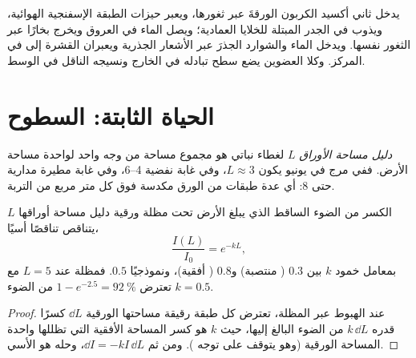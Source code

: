 \begin{example}\label{ex:b1:flowering-plant-organization:where}
يدخل ثاني أكسيد الكربون الورقةَ عبر ثغورها، ويعبر حيزات الطبقة
الإسفنجية الهوائية، ويذوب في الجدر المبتلة للخلايا العمادية؛ ويصل
الماء في  العروق ويخرج بخارًا عبر الثغور نفسها. ويدخل الماء
والشوارد الجذرَ عبر الأشعار الجذرية ويعبران القشرة إلى  في
المركز. وكلا العضوين يضع سطح تبادله في الخارج ونسيجه الناقل في
الوسط.
\end{example}

\section{الحياة الثابتة: السطوح}

\begin{definition}\label{def:b1:flowering-plant-organization:lai}
\emph{دليل مساحة الأوراق} $L$ لغطاء نباتي
هو مجموع مساحة  من وجه واحد لواحدة مساحة الأرض. ففي مرج في
يونيو يكون $L \approx 3$، وفي غابة نفضية \qtyrange{4}{6}{}، وفي غابة
مطيرة مدارية حتى \qty{8}{}: أي عدة طبقات من الورق مكدسة فوق كل متر
مربع من التربة.
\end{definition}

\begin{proposition}\label{prop:b1:flowering-plant-organization:beer}
الكسر من الضوء الساقط الذي يبلغ الأرض تحت مظلة ورقية دليل مساحة
أوراقها $L$ يتناقص تناقصًا أسيًا،
\[
\frac{I(L)}{I_0} = e^{-kL},
\]
بمعامل خمود $k$ بين $0.3$ ( منتصبة) و$0.8$ ( أفقية)،
ونموذجيًا $0.5$. فمظلة عند $L = 5$ مع $k = 0.5$ تعترض
$1 - e^{-2.5} = \qty{92}{\%}$ من الضوء.
\end{proposition}
\begin{proof}
عند الهبوط عبر المظلة، تعترض كل طبقة رقيقة مساحتها الورقية $\dd L$
كسرًا قدره $k\,\dd L$ من الضوء البالغ إليها، حيث $k$ هو كسر المساحة
الأفقية التي تظللها واحدة المساحة الورقية (وهو يتوقف على توجه
). ومن ثم $\dd I = -kI\,\dd L$، وحله هو الأسي.
\end{proof}

